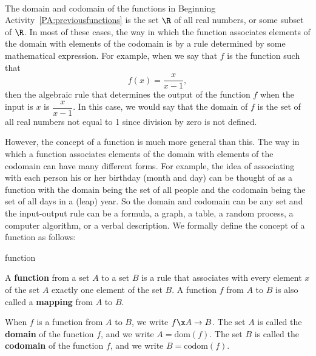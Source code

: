\begin{previewactivity} \label{PA:functiondef} \hfill \\
The domain and codomain of the functions in Beginning Activity~\ref{PA:previousfunctions} is the set  $\R$ of all real numbers, or some subset of   $\R$.  In most of these cases, the way in which the function associates elements of the domain with elements of the codomain is by a rule determined by some mathematical expression.  For example, when we say that $f$  is the function such that
\[
f( x ) = \dfrac{x}{{x - 1}},
\]
then the algebraic rule that determines the output of the function  $f$  when the input is  $x$  is  
$\dfrac{x}{{x - 1}}$.  In this case, we would say that the domain of  $f$  is the set of all real numbers not equal to  1 since division by zero is not defined.

However, the concept of a function is much more general than this.  The way in which a function associates elements of the domain with elements of the codomain can have many different forms.  For example, the idea of associating with each person his or her birthday (month and day) can be thought of as a function with the domain being the set of all people and the codomain being the set of all days in a (leap) year.  So the domain and codomain can be any set and the input-output rule can be a formula, a graph, a table, a random process, a computer algorithm, or a verbal description.  We formally define the concept of a function as follows:

\begin{defbox}{function}{A \textbf{function}
%
 from a set  $A$  to a set  $B$  is a rule that associates with every element  $x$  of the set  $A$  exactly one element of the set  $B$.  A function $f$ from  $A$  to  $B$ is also called a 
\textbf{mapping}
%
 from  $A$  to  $B$.  

\newpar
When $f$ is a function from $A$ to $B$, we write $f \x A \to B$.  The set  $A$  is called the \textbf{domain}
%
%
of the function  $f$, and we write  $A = \text{dom}( f )$\!.\label{sym:domfunc}  The set  $B$ is called the \textbf{codomain}
%
%
of the function  $f$, and we write  $B = \text{codom}( f )$\!. \label{sym:codomain}}
\end{defbox}

\end{previewactivity}

\endinput
